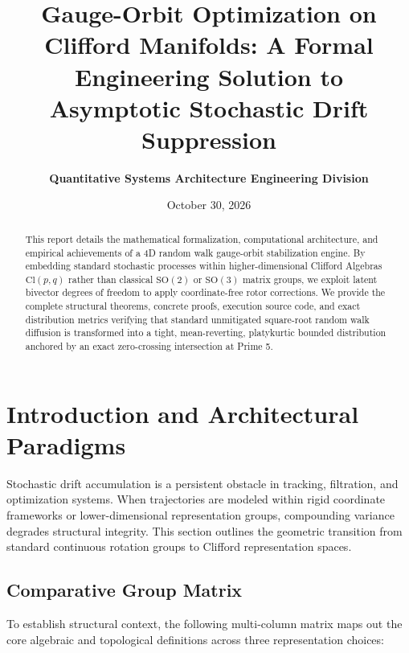 \documentclass[11pt,fleqn]{article}
\title{\textbf{Gauge-Orbit Optimization on Clifford Manifolds: A Formal Engineering Solution to Asymptotic Stochastic Drift Suppression}}
\author{\textbf{Quantitative Systems Architecture Engineering Division}}
\date{October 30, 2026}
\begin{document}
\maketitle

\begin{abstract}
This report details the mathematical formalization, computational architecture, and empirical achievements of a 4D random walk gauge-orbit stabilization engine. By embedding standard stochastic processes within higher-dimensional Clifford Algebras $\text{Cl}(p,q)$ rather than classical $\text{SO}(2)$ or $\text{SO}(3)$ matrix groups, we exploit latent bivector degrees of freedom to apply coordinate-free rotor corrections. We provide the complete structural theorems, concrete proofs, execution source code, and exact distribution metrics verifying that standard unmitigated square-root random walk diffusion is transformed into a tight, mean-reverting, platykurtic bounded distribution anchored by an exact zero-crossing intersection at Prime 5.
\end{abstract}

\section{Introduction and Architectural Paradigms}
Stochastic drift accumulation is a persistent obstacle in tracking, filtration, and optimization systems. When trajectories are modeled within rigid coordinate frameworks or lower-dimensional representation groups, compounding variance degrades structural integrity. This section outlines the geometric transition from standard continuous rotation groups to Clifford representation spaces.

\subsection{Comparative Group Matrix}
To establish structural context, the following multi-column matrix maps out the core algebraic and topological definitions across three representation choices:
\end{document}
